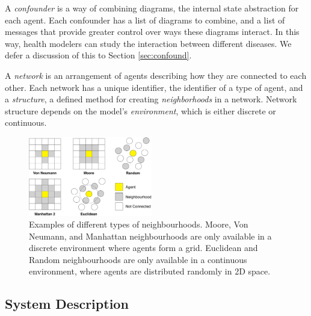 \documentclass{sig-alternate}
\begin{document}
A \emph{confounder} is a way of combining diagrams, the internal state abstraction for each agent. Each confounder has a list of diagrams to combine, and  a list of messages that provide greater control over ways these diagrams interact. In this way, health modelers can study the interaction between different diseases. We defer a discussion of this to Section \ref{sec:confound}.


A \emph{network} is an arrangement of agents describing how they are connected to each other. Each network has a unique identifier, the identifier of a type of agent, and a \emph{structure}, a defined method for creating \emph{neighborhoods} in a network. Network structure depends on the model's \emph{environment}, which is either discrete or continuous.


\begin{figure}[h]
\includegraphics[width=0.48\textwidth]{neighbourhoods.pdf}
\caption{Examples of different types of neighbourhoods. Moore, Von Neumann, and Manhattan neighbourhoods are only available in a discrete environment where agents form a grid. Euclidean and Random neighbourhoods are only available in a continuous environment, where agents are distributed randomly in 2D space.}
\label{fig:neighborhoods}
\end{figure}


\subsection{System Description}
\end{document}
